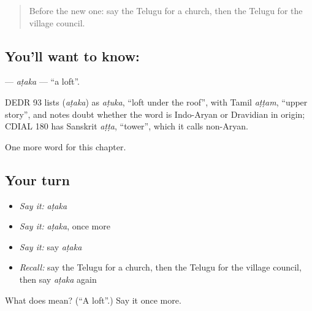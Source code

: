 \label{lesson:TE-C293-ataka}



\begin{quote}
Before the new one: say the Telugu for a church, then the Telugu for the village council.
\end{quote}

\subsection*{You'll want to know: }
\textbf{} — \emph{aṭaka} — \textquotedblleft{}a loft\textquotedblright{}.

\begin{cousinweb}
DEDR 93 lists \textbf{} (\emph{aṭaka}) as \emph{aṭuka}, \textquotedblleft{}loft under the roof\textquotedblright{}, with Tamil \emph{aṭṭam}, \textquotedblleft{}upper story\textquotedblright{}, and notes doubt whether the word is Indo-Aryan or Dravidian in origin; CDIAL 180 has Sanskrit \emph{aṭṭa}, \textquotedblleft{}tower\textquotedblright{}, which it calls non-Aryan.
\end{cousinweb}

\begin{grammarlens}[title={What you've built}]
One more word for this chapter.
\end{grammarlens}

\subsection*{Your turn}
\begin{itemize}
\raggedright
  \item \emph{Say it:} \emph{aṭaka}
  \item \emph{Say it:} \emph{aṭaka}, once more
  \item \emph{Say it:} say \emph{aṭaka}
  \item \emph{Recall:} say the Telugu for a church, then the Telugu for the village council, then say \emph{aṭaka} again
\end{itemize}

\begin{tcolorbox}[breakable,colback=teal!4,colframe=teal!35!black,title={Before you move on}]
What does  mean? (\textquotedblleft{}A loft\textquotedblright{}.) Say it once more.
\end{tcolorbox}
